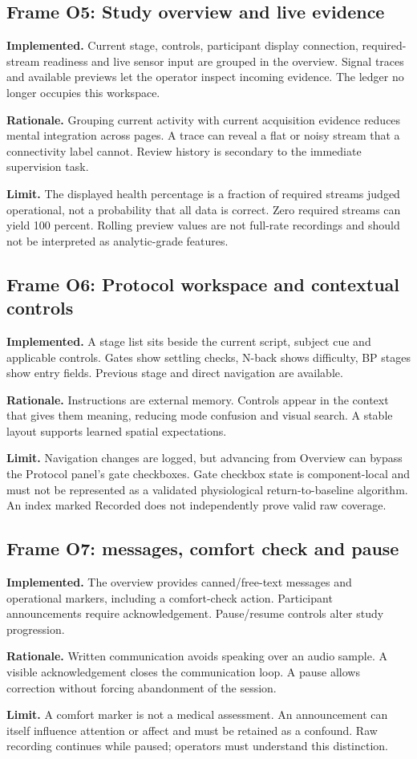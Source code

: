 \documentclass[11pt,a4paper]{article}
\begin{document}
\subsection{Frame O5: Study overview and live evidence}
\textbf{Implemented.} Current stage, controls, participant display connection, required-stream readiness and live sensor input are grouped in the overview. Signal traces and available previews let the operator inspect incoming evidence. The ledger no longer occupies this workspace.\par
\textbf{Rationale.} Grouping current activity with current acquisition evidence reduces mental integration across pages. A trace can reveal a flat or noisy stream that a connectivity label cannot. Review history is secondary to the immediate supervision task.\par
\textbf{Limit.} The displayed health percentage is a fraction of required streams judged operational, not a probability that all data is correct. Zero required streams can yield 100 percent. Rolling preview values are not full-rate recordings and should not be interpreted as analytic-grade features.

\subsection{Frame O6: Protocol workspace and contextual controls}
\textbf{Implemented.} A stage list sits beside the current script, subject cue and applicable controls. Gates show settling checks, N-back shows difficulty, BP stages show entry fields. Previous stage and direct navigation are available.\par
\textbf{Rationale.} Instructions are external memory. Controls appear in the context that gives them meaning, reducing mode confusion and visual search. A stable layout supports learned spatial expectations.\par
\textbf{Limit.} Navigation changes are logged, but advancing from Overview can bypass the Protocol panel's gate checkboxes. Gate checkbox state is component-local and must not be represented as a validated physiological return-to-baseline algorithm. An index marked Recorded does not independently prove valid raw coverage.

\subsection{Frame O7: messages, comfort check and pause}
\textbf{Implemented.} The overview provides canned/free-text messages and operational markers, including a comfort-check action. Participant announcements require acknowledgement. Pause/resume controls alter study progression.\par
\textbf{Rationale.} Written communication avoids speaking over an audio sample. A visible acknowledgement closes the communication loop. A pause allows correction without forcing abandonment of the session.\par
\textbf{Limit.} A comfort marker is not a medical assessment. An announcement can itself influence attention or affect and must be retained as a confound. Raw recording continues while paused; operators must understand this distinction.
\end{document}
